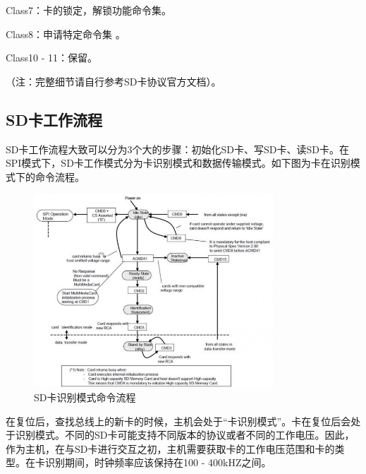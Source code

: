 Class7：卡的锁定，解锁功能命令集。

Class8：申请特定命令集 。

Class10 - 11：保留。

（注：完整细节请自行参考SD卡协议官方文档）。

\subsection{SD卡工作流程}

SD卡工作流程大致可以分为3个大的步骤：初始化SD卡、写SD卡、读SD卡。在SPI模式下，SD卡工作模式分为卡识别模式和数据传输模式。如下图为卡在识别模式下的命令流程。

\begin{figure}[H]
    \centering
    \includegraphics[width=0.8\textwidth]{figures/06-02-命令流程.png}
    \caption{SD卡识别模式命令流程}
\end{figure}


在复位后，查找总线上的新卡的时候，主机会处于“卡识别模式”。卡在复位后会处于识别模式。不同的SD卡可能支持不同版本的协议或者不同的⼯作电压。因此，作为主机，在与SD卡进行交互之初，主机需要获取卡的工作电压范围和卡的类型。在卡识别期间，时钟频率应该保持在100 - 400kHZ之间。

